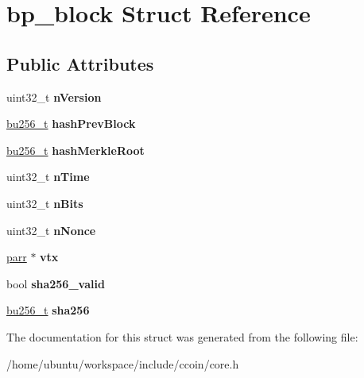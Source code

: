 \hypertarget{structbp__block}{\section{bp\-\_\-block Struct Reference}
\label{structbp__block}
}
\subsection*{Public Attributes}
\begin{DoxyCompactItemize}
\item 
\hypertarget{structbp__block_a8f516155329bcd4c0c53983a63fe21d5}{uint32\-\_\-t {\bfseries n\-Version}}\label{structbp__block_a8f516155329bcd4c0c53983a63fe21d5}

\item 
\hypertarget{structbp__block_a560e5c30d00cdaf47e795dcf7f74b9db}{\hyperlink{structbu256}{bu256\-\_\-t} {\bfseries hash\-Prev\-Block}}\label{structbp__block_a560e5c30d00cdaf47e795dcf7f74b9db}

\item 
\hypertarget{structbp__block_a8d55527fa38415954dd2457750681931}{\hyperlink{structbu256}{bu256\-\_\-t} {\bfseries hash\-Merkle\-Root}}\label{structbp__block_a8d55527fa38415954dd2457750681931}

\item 
\hypertarget{structbp__block_a6e4fbd52f800afb975de538f331414b9}{uint32\-\_\-t {\bfseries n\-Time}}\label{structbp__block_a6e4fbd52f800afb975de538f331414b9}

\item 
\hypertarget{structbp__block_a080334911881ee4aaa87bf7db5b222b0}{uint32\-\_\-t {\bfseries n\-Bits}}\label{structbp__block_a080334911881ee4aaa87bf7db5b222b0}

\item 
\hypertarget{structbp__block_a02c7f3ab48c3d46298158b1762f4b9e5}{uint32\-\_\-t {\bfseries n\-Nonce}}\label{structbp__block_a02c7f3ab48c3d46298158b1762f4b9e5}

\item 
\hypertarget{structbp__block_af40ad71af239348ce05870bb1162460b}{\hyperlink{structparr}{parr} $\ast$ {\bfseries vtx}}\label{structbp__block_af40ad71af239348ce05870bb1162460b}

\item 
\hypertarget{structbp__block_a856ab7e81c339c59ab2b2a55736a2f89}{bool {\bfseries sha256\-\_\-valid}}\label{structbp__block_a856ab7e81c339c59ab2b2a55736a2f89}

\item 
\hypertarget{structbp__block_a48a2c53c3b83c5cebfd78599d89f8e59}{\hyperlink{structbu256}{bu256\-\_\-t} {\bfseries sha256}}\label{structbp__block_a48a2c53c3b83c5cebfd78599d89f8e59}

\end{DoxyCompactItemize}


The documentation for this struct was generated from the following file\-:\begin{DoxyCompactItemize}
\item 
/home/ubuntu/workspace/include/ccoin/core.\-h\end{DoxyCompactItemize}
